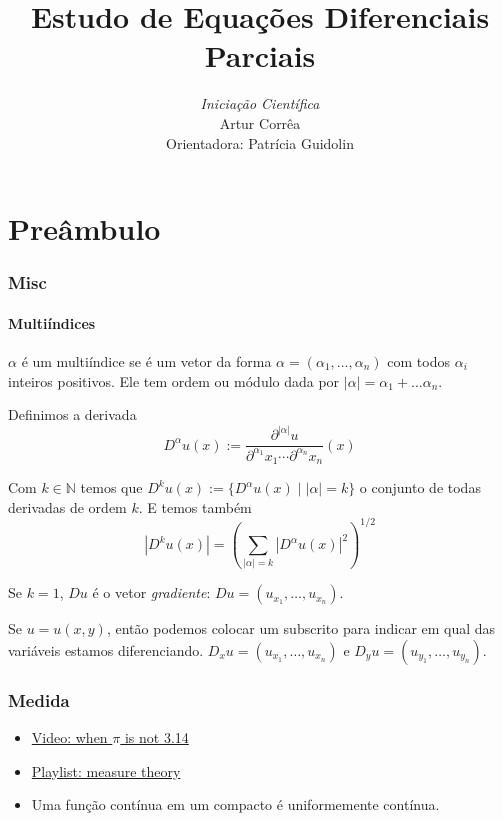 \documentclass[11pt]{article}
\title{Estudo de Equações Diferenciais Parciais}
\author{\textit{Iniciação Científica}\\   Artur Corrêa \\ Orientadora: Patrícia Guidolin}
\newcommand{\N}{\mathbb{N}}
\newcommand{\p}{\partial}
\begin{document}
\maketitle
\tableofcontents

\pagebreak
\part{Preâmbulo}
\section{Misc}
\subsection{Multiíndices}

\( \alpha \) é um multiíndice se é um vetor da forma \( \alpha = (\alpha_1, \ldots, \alpha_n) \) com todos \( \alpha_i \) inteiros positivos. Ele tem ordem ou módulo dada por \( |\alpha| = \alpha_1 + \ldots \alpha_n \).

Definimos a derivada \[ D^\alpha u(x) := \frac{\p^{|\alpha|}u}{\p^{\alpha_1}x_1 \cdots \p^{\alpha_n}x_n}(x) \]

Com \( k \in \N \) temos que \( D^ku(x):=\{ D^{\alpha}u(x) \mid  |\alpha| =k\} \) o conjunto de todas derivadas de ordem \( k \). E temos também \[ | D^k u(x) | = \left( \sum_{|\alpha|=k}|D^{\alpha}u(x)|^2\right)^{1/2} \]

Se \( k=1 \), \( Du \) é o vetor \textit{gradiente}: \( Du=(u_{x_1}, \ldots, u_{x_n}) \).

Se \( u=u(x,y) \), então podemos colocar um subscrito para indicar em qual das variáveis estamos diferenciando. \( D_xu = (u_{x_1}, \ldots, u_{x_n}) \) e \( D_yu=(u_{y_1}, \ldots, u_{y_n}) \).

\section{Medida}

\begin{itemize}
	\item \href{https://www.youtube.com/watch?v=ineO1tIyPfM}{Video: when \( \pi \) is not 3.14}
	\item \href{https://www.youtube.com/playlist?list=PLBh2i93oe2qvMVqAzsX1Kuv6-4fjazZ8j}{Playlist: measure theory}
\end{itemize}

\begin{itemize}
	\item Uma função contínua em um compacto é uniformemente contínua.
\end{itemize}
\end{document}

